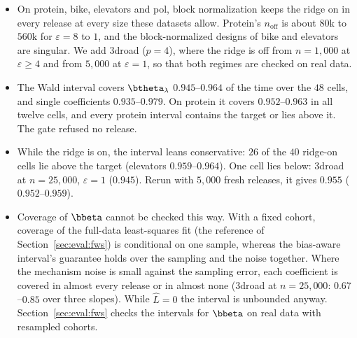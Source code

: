 \begin{itemize}[noitemsep]
  \item On protein, bike, elevators and pol, block normalization keeps the ridge on in every release at every size these datasets allow. Protein's $n_{\mathrm{off}}$ is about $80$k to $560$k for $\varepsilon = 8$ to $1$, and the block-normalized designs of bike and elevators are singular. We add 3droad ($p = 4$), where the ridge is off from $n = 1{,}000$ at $\varepsilon \ge 4$ and from $5{,}000$ at $\varepsilon = 1$, so that both regimes are checked on real data.
  \item The Wald interval covers $\btheta_\lambda$ $0.945$--$0.964$ of the time over the $48$ cells, and single coefficients $0.935$--$0.979$. On protein it covers $0.952$--$0.963$ in all twelve cells, and every protein interval contains the target or lies above it. The gate refused no release.
  \item While the ridge is on, the interval leans conservative: $26$ of the $40$ ridge-on cells lie above the target (elevators $0.959$--$0.964$). One cell lies below: 3droad at $n = 25{,}000$, $\varepsilon = 1$ ($0.945$). Rerun with $5{,}000$ fresh releases, it gives $0.955$ ($0.952$--$0.959$).
  \item Coverage of $\bbeta$ cannot be checked this way. With a fixed cohort, coverage of the full-data least-squares fit (the reference of Section~\ref{sec:eval:fws}) is conditional on one sample, whereas the bias-aware interval's guarantee holds over the sampling and the noise together. Where the mechanism noise is small against the sampling error, each coefficient is covered in almost every release or in almost none (3droad at $n = 25{,}000$: $0.67$--$0.85$ over three slopes). While $\hat L = 0$ the interval is unbounded anyway. Section~\ref{sec:eval:fws} checks the intervals for $\bbeta$ on real data with resampled cohorts.
\end{itemize}

